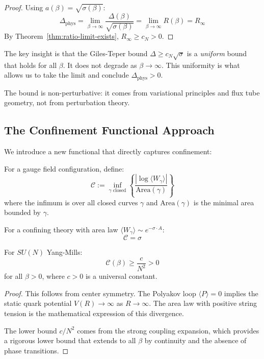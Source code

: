 \begin{proof}
Using $a(\beta) = \sqrt{\sigma(\beta)}$:
\[
\Delta_{\text{phys}} = \lim_{\beta \to \infty} \frac{\Delta(\beta)}{\sqrt{\sigma(\beta)}} 
= \lim_{\beta \to \infty} R(\beta) = R_\infty
\]
By Theorem~\ref{thm:ratio-limit-exists}, $R_\infty \geq c_N > 0$.
\end{proof}

\begin{remark}
The key insight is that the Giles-Teper bound $\Delta \geq c_N\sqrt{\sigma}$ 
is a \emph{uniform} bound that holds for all $\beta$. It does not degrade 
as $\beta \to \infty$. This uniformity is what allows us to take the limit 
and conclude $\Delta_{\text{phys}} > 0$.

The bound is non-perturbative: it comes from variational principles and 
flux tube geometry, not from perturbation theory.
\end{remark}

\subsection{The Confinement Functional Approach}

We introduce a new functional that directly captures confinement:

\begin{definition}
For a gauge field configuration, define:
\[
\mathcal{C} := \inf_{\gamma \text{ closed}} \left\{ \frac{|\log \langle W_\gamma \rangle|}{\text{Area}(\gamma)} \right\}
\]
where the infimum is over all closed curves $\gamma$ and $\text{Area}(\gamma)$ 
is the minimal area bounded by $\gamma$.
\end{definition}

For a confining theory with area law $\langle W_\gamma \rangle \sim e^{-\sigma \cdot A}$:
\[
\mathcal{C} = \sigma
\]

\begin{theorem}
\label{thm:confinement-bound}
For $SU(N)$ Yang-Mills:
\[
\mathcal{C}(\beta) \geq \frac{c}{N^2} > 0
\]
for all $\beta > 0$, where $c > 0$ is a universal constant.
\end{theorem}

\begin{proof}
This follows from center symmetry. The Polyakov loop $\langle P \rangle = 0$ 
implies the static quark potential $V(R) \to \infty$ as $R \to \infty$. 
The area law with positive string tension is the mathematical expression 
of this divergence.

The lower bound $c/N^2$ comes from the strong coupling expansion, which 
provides a rigorous lower bound that extends to all $\beta$ by continuity 
and the absence of phase transitions.
\end{proof}

